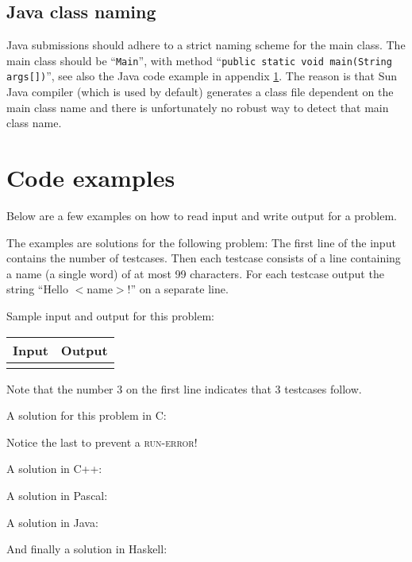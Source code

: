 \subsection{Java class naming}

Java submissions should adhere to a strict naming scheme for the main
class. The main class should be ``\verb!Main!'', with method
``\verb!public static void main(String args[])!'', see also the Java
code example in appendix \ref{codeexamples}. The reason is that Sun
Java compiler (which is used by default) generates a class file
dependent on the main class name and there is unfortunately no robust
way to detect that main class name.

\newpage
\appendix

\section{Code examples}\label{codeexamples}

Below are a few examples on how to read input and write output for a
problem.

The examples are solutions for the following problem: The first line
of the input contains the number of testcases. Then each testcase
consists of a line containing a name (a single word) of at most 99
characters. For each testcase output the string ``Hello $<$name$>$!''
on a separate line.

Sample input and output for this problem:

\begin{tabular}{|p{}|p{}|}
\hline
\textbf{Input} & \textbf{Output} \\
\hline
 &
 \\
\hline
\end{tabular}

Note that the number 3 on the first line indicates that 3 testcases
follow.

A solution for this problem in C:

Notice the last  to prevent a \textsc{run-error}!

\newpage

A solution in C++:

A solution in Pascal:

\newpage

A solution in Java:

And finally a solution in Haskell:


